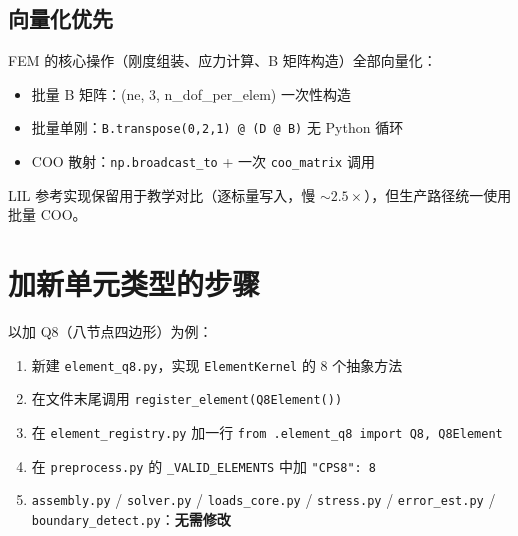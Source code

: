 \documentclass[12pt,a4paper]{ctexart}
\begin{document}
\subsection{向量化优先}

FEM 的核心操作（刚度组装、应力计算、B 矩阵构造）全部向量化：
\begin{itemize}
  \item 批量 B 矩阵：(ne, 3, n\_dof\_per\_elem) 一次性构造
  \item 批量单刚：\texttt{B.transpose(0,2,1) @ (D @ B)} 无 Python 循环
  \item COO 散射：\texttt{np.broadcast\_to} + 一次 \texttt{coo\_matrix} 调用
\end{itemize}

LIL 参考实现保留用于教学对比（逐标量写入，慢 $\sim 2.5\times$），但生产路径统一使用批量 COO。

\section{加新单元类型的步骤}

以加 Q8（八节点四边形）为例：

\begin{enumerate}[leftmargin=*]
  \item 新建 \texttt{element\_q8.py}，实现 \texttt{ElementKernel} 的 8 个抽象方法
  \item 在文件末尾调用 \texttt{register\_element(Q8Element())}
  \item 在 \texttt{element\_registry.py} 加一行 \texttt{from .element\_q8 import Q8, Q8Element}
  \item 在 \texttt{preprocess.py} 的 \texttt{\_VALID\_ELEMENTS} 中加 \texttt{"CPS8": 8}
  \item \texttt{assembly.py} / \texttt{solver.py} / \texttt{loads\_core.py} / \texttt{stress.py} / \texttt{error\_est.py} / \texttt{boundary\_detect.py}：\textbf{无需修改}
\end{enumerate}
\end{document}
